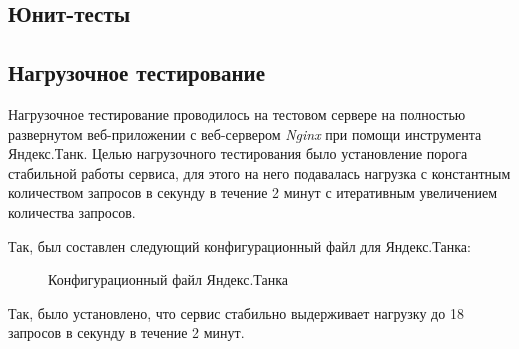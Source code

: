     \subsection{Юнит-тесты}

    \subsection{Нагрузочное тестирование}
    Нагрузочное тестирование проводилось на тестовом сервере на полностью
    развернутом веб-приложении с веб-сервером \textit{Nginx} при помощи
    инструмента Яндекс.Танк. Целью нагрузочного тестирования было установление
    порога стабильной работы сервиса, для этого на него подавалась нагрузка
    с константным количеством запросов в секунду в течение 2 минут с итеративным
    увеличением количества запросов.

    Так, был составлен следующий конфигурационный файл для Яндекс.Танка:
    \begin{figure}[H]
        \centering
        
        \caption{Конфигурационный файл Яндекс.Танка}
        \label{fig:tank_load}
    \end{figure}

    Так, было установлено, что сервис стабильно выдерживает нагрузку до 18
    запросов в секунду в течение 2 минут.
